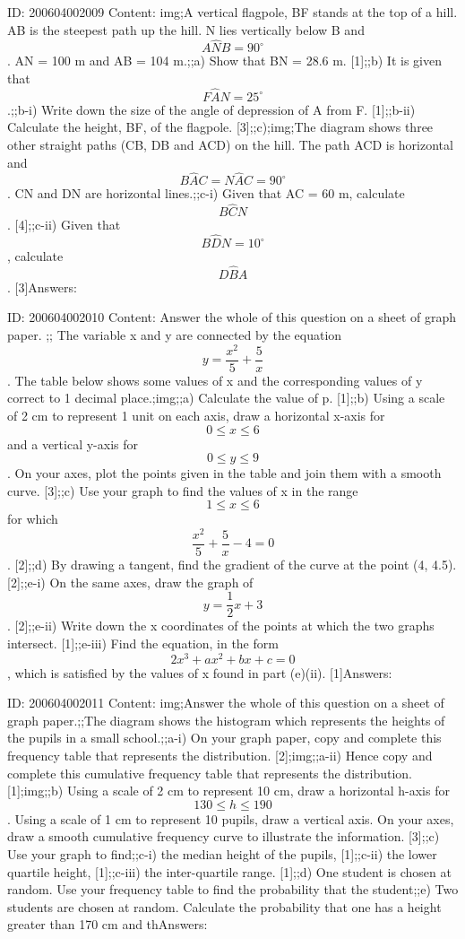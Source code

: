 \documentclass{article}
\begin{document}
ID: 200604002009
Content:
img;A vertical flagpole, BF stands at the top of a hill. AB is the steepest path up the hill. N lies vertically below B and $$A \hat NB=90^{\circ}$$. AN = 100 m and AB = 104 m.;;a) Show that BN = 28.6 m. [1];;b) It is given that $$F \hat AN=25^{\circ}$$.;;b-i) Write down the size of the angle of depression of A from F. [1];;b-ii) Calculate the height, BF, of the flagpole. [3];;c);img;The diagram shows three other straight paths (CB, DB and ACD) on the hill. The path ACD is horizontal and $$B \hat AC=N \hat AC=90^{\circ}$$. CN and DN are horizontal lines.;;c-i) Given that AC = 60 m, calculate $$B \hat CN$$. [4];;c-ii) Given that $$B \hat DN=10^{\circ}$$, calculate $$D \hat BA$$. [3]Answers:

ID: 200604002010
Content:
Answer the whole of this question on a sheet of graph paper. ;; The variable x and y are connected by the equation $$y=\frac{x^{2}}{5}+\frac{5}{x}$$. The table below shows some values of x and the corresponding values of y correct to 1 decimal place.;img;;a) Calculate the value of p. [1];;b) Using a scale of 2 cm to represent 1 unit on each axis, draw a horizontal x-axis for $$0\leq x\leq 6$$ and a vertical y-axis for $$0\leq y\leq 9$$. On your axes, plot the points given in the table and join them with a smooth curve. [3];;c) Use your graph to find the values of x in the range $$1\leq x\leq 6$$ for which $$\frac{x^{2}}{5}+\frac{5}{x}-4=0$$. [2];;d) By drawing a tangent, find the gradient of the curve at the point (4, 4.5). [2];;e-i) On the same axes, draw the graph of $$y=\frac{1}{2}x+3$$. [2];;e-ii) Write down the x coordinates of the points at which the two graphs intersect. [1];;e-iii) Find the equation, in the form $$2x^{3} +ax^{2} +bx+c=0$$, which is satisfied by the values of x found in part (e)(ii). [1]Answers:

ID: 200604002011
Content:
img;Answer the whole of this question on a sheet of graph paper.;;The diagram shows the histogram which represents the heights of the pupils in a small school.;;a-i) On your graph paper, copy and complete this frequency table that represents the	distribution. [2];img;;a-ii) Hence copy and complete this cumulative frequency table that represents the distribution. [1];img;;b) Using a scale of 2 cm to represent 10 cm, draw a horizontal h-axis for $$130\leq h\leq 190$$. Using a scale of 1 cm to represent 10 pupils, draw a vertical axis. On your axes, draw a smooth cumulative frequency curve to illustrate the information. [3];;c) Use your graph to find;;c-i) the median height of the pupils, [1];;c-ii) the lower quartile height, [1];;c-iii) the inter-quartile range. [1];;d) One student is chosen at random. Use your frequency table to find the probability that the student;;e) Two students are chosen at random. Calculate the probability that one has a height greater than 170 cm and thAnswers:
\end{document}

